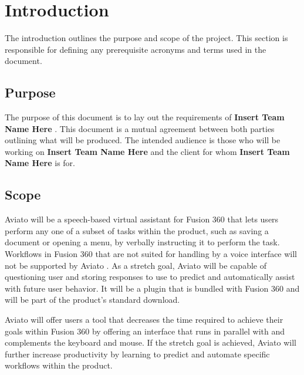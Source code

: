 \documentclass[onecolumn, draftclsnofoot,10pt, compsoc]{IEEEtran}
\def \CapstoneTeamName{\textbf{Insert Team Name Here} }
\def \botname{Aviato }
\begin{document}
\newpage
{}
\tableofcontents
\clearpage

\section{Introduction}
        The introduction outlines the purpose and scope of the project. 
        This section is responsible for defining any prerequisite acronyms and terms used in the document. 
    \subsection{Purpose}
        The purpose of this document is to lay out the requirements of \CapstoneTeamName. 
        This document is a mutual agreement between both parties outlining what will be produced. 
        The intended audience is those who will be working on \CapstoneTeamName and the client for whom \CapstoneTeamName is for.
    \subsection{Scope}
        \botname will be a speech-based virtual assistant for Fusion 360 that lets users perform any one of a subset of tasks within the product, such as saving a document or opening a menu, by verbally instructing it to perform the task.
        Workflows in Fusion 360 that are not suited for handling by a voice interface will not be supported by \botname.
        As a stretch goal, \botname will be capable of questioning user and storing responses to use to predict and automatically assist with future user behavior.
        It will be a plugin that is bundled with Fusion 360 and will be part of the product's standard download.

        \botname will offer users a tool that decreases the time required to achieve their goals within Fusion 360 by offering an interface that runs in parallel with and complements the keyboard and mouse.
        If the stretch goal is achieved, \botname will further increase productivity by learning to predict and automate specific workflows within the product.
        
\end{document}

